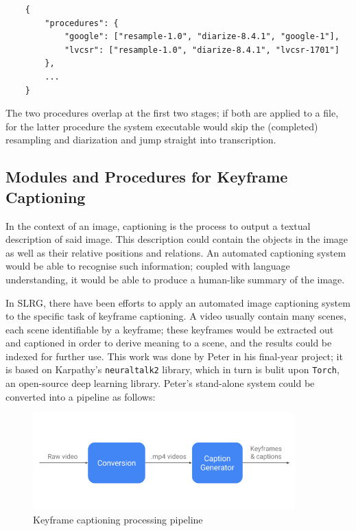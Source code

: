 \begin{lstlisting}
    {
        "procedures": {
            "google": ["resample-1.0", "diarize-8.4.1", "google-1"],
            "lvcsr": ["resample-1.0", "diarize-8.4.1", "lvcsr-1701"]
        },
        ...
    }
\end{lstlisting}

The two procedures overlap at the first two stages; if both are applied to a file, for the latter procedure the system executable would skip the (completed) resampling and diarization and jump straight into transcription.

\subsection{Modules and Procedures for Keyframe Captioning}

In the context of an image, captioning is the process to output a textual description of said image. This description could contain the objects in the image as well as their relative positions and relations. An automated captioning system would be able to recognise such information; coupled with language understanding, it would be able to produce a human-like summary of the image.

In SLRG, there have been efforts to apply an automated image captioning system to the specific task of keyframe captioning. A video usually contain many scenes, each scene identifiable by a keyframe; these keyframes would be extracted out and captioned in order to derive meaning to a scene, and the results could be indexed for further use. This work was done by Peter in his final-year project; it is based on Karpathy's \texttt{neuraltalk2} library, which in turn is bulit upon \texttt{Torch}, an open-source deep learning library. Peter's stand-alone system could be converted into a pipeline as follows:

\begin{figure}[h]
\begin{center}
    \includegraphics[width=0.9\textwidth]{../images/pipeline_capgen.png}
    \caption{Keyframe captioning processing pipeline}
\end{center}
\end{figure}


